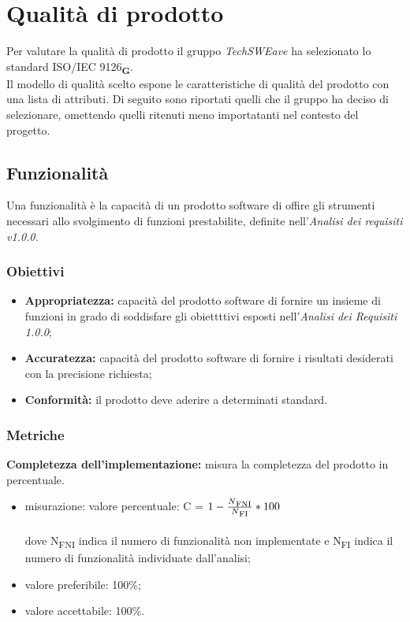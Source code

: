\section{Qualità di prodotto}
Per valutare la qualità di prodotto il gruppo  \textit{TechSWEave} ha selezionato lo standard ISO/IEC 9126\textsubscript{\textbf{G}}.\\
Il modello di qualità scelto espone le caratteristiche di qualità del prodotto con una lista di attributi. Di seguito sono riportati quelli che il 
gruppo ha deciso di selezionare, omettendo quelli ritenuti meno importatanti nel contesto del progetto.
\subsection{Funzionalità}
Una funzionalità è la capacità di un prodotto software di offire gli strumenti necessari allo svolgimento di funzioni prestabilite, definite 
nell'\textit{Analisi dei requisiti v1.0.0.}
\subsubsection{Obiettivi}
\begin{itemize}
    \item \textbf{Appropriatezza:} capacità del prodotto software di fornire un insieme di funzioni in grado
    di soddisfare gli obiettttivi esposti nell’\textit{Analisi dei Requisiti 1.0.0};
    \item \textbf{Accuratezza:} capacità del prodotto software di fornire i risultati desiderati con la precisione richiesta;
    \item \textbf{Conformità:} il prodotto deve aderire a determinati standard.
\end{itemize}
\subsubsection{Metriche}
\textbf{Completezza dell'implementazione:} misura la completezza del prodotto in percentuale.
\begin{itemize}
    \item misurazione: valore percentuale: C = $1-\frac{N\textsubscript{FNI}}{N\textsubscript{FI}}*100$ \\
    \\dove N\textsubscript{FNI} indica il numero di funzionalità non implementate e N\textsubscript{FI} indica il numero di funzionalità 
    individuate dall'analisi;
    \item valore preferibile: 100\%;
    \item valore accettabile: 100\%.
\end{itemize}

